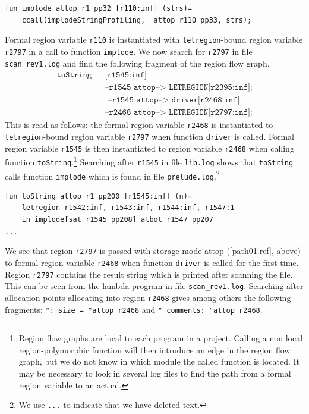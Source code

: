 \documentclass[12pt]{book}
\begin{document}
\begin{verbatim}
fun implode attop r1 pp32 [r110:inf] (strs)= 
    ccall(implodeStringProfiling,  attop r110 pp33, strs); 
\end{verbatim}
\noindent
Formal region variable \texttt{r110} is instantiated with {\tt letregion}-bound
region variable \texttt{r2797} in a call to function \texttt{implode}. We
now search for \texttt{r2797} in file \texttt{scan\_rev1.log} and find the
following fragment of the region flow graph.
\begin{eqnarray}
\texttt{toString}&&\texttt{[r1545:inf]} \nonumber\\
& &\texttt{--r1545 attop-->  LETREGION[r2395:inf];} \nonumber \\
& &\texttt{ --r1545 attop-->   driver[r2468:inf]} \nonumber \\
& &\texttt{--r2468 attop--> LETREGION[r2797:inf];} \label{path01.ref}
\end{eqnarray}
\noindent
This is read as follows: the formal region variable \texttt{r2468} is
instantiated to {\tt letregion}-bound region variable \texttt{r2797} when
function \texttt{driver} is called. Formal region variable \texttt{r1545}
is then instantiated to region variable \texttt{r2468} when calling
function \texttt{toString}.\footnote{Region flow graphs are local to each
  program in a project. Calling a non local region-polymorphic function
  will then introduce an edge in the region flow graph, but we do not know
  in which module the called function is located. It may be necessary to
  look in several log files to find the path from a formal region variable
  to an actual.}
Searching after \texttt{r1545} in file \texttt{lib.log} shows that
\texttt{toString} calls function \texttt{implode} which is found in file
\texttt{prelude.log}.\footnote{We use \texttt{...} to indicate that we have
  deleted text.}

\begin{verbatim}
fun toString attop r1 pp200 [r1545:inf] (n)= 
    letregion r1542:inf, r1543:inf, r1544:inf, r1547:1 
    in implode[sat r1545 pp208] atbot r1547 pp207 
...
\end{verbatim}
\noindent
We see that region \texttt{r2797} is passed with storage mode attop
(\ref{path01.ref}, above) to formal region variable \texttt{r2468} when
function \texttt{driver} is called for the first time. Region \texttt{r2797}
contains the result string which is printed after scanning the file. This
can be seen from the lambda program in file \texttt{scan\_rev1.log}.
Searching after allocation points allocating into region \texttt{r2468}
gives among others the following fragments: \texttt{": size = "attop r2468}
and \texttt{" comments: "attop r2468}.
\end{document}
